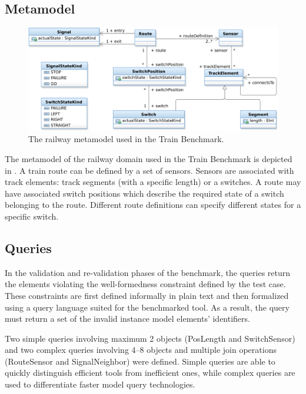 \subsection{Metamodel}
\label{sec:domain}

\begin{figure}[htb]
\begin{center}
\includegraphics[width=1\columnwidth]{figures/TrainMM.pdf}
\caption{The railway metamodel used in the Train Benchmark.}
\label{fig:metamodel}
\end{center}
\end{figure}


The metamodel of the railway domain used in the Train Benchmark is depicted in . A train \textsf{route} can be defined by a set of \textsf{sensors}. Sensors are associated with \textsf{track elements}: track \textsf{segment}s (with a specific length) or a \textsf{switch}es. A route may have associated \textsf{switch positions} which describe the required state of a switch belonging to the route. Different route definitions can specify different states for a specific switch.
 
\subsection{Queries}
\label{sec:queries}

In the validation and re-validation phases of the benchmark, the queries return the elements violating the well-formedness constraint defined by the test case. These constraints are first defined informally in plain text and then formalized using a query language suited for the benchmarked tool. As a result, the query must return a set of the invalid instance model elements' identifiers.
 
Two simple queries involving maximum 2 objects (\textsf{PosLength} and \textsf{SwitchSensor}) and two complex queries involving 4--8 objects and multiple join operations (\textsf{RouteSensor} and \textsf{SignalNeighbor}) were defined. Simple queries are able to quickly distinguish efficient tools from inefficient ones, while complex queries are used to differentiate faster model query technologies.
 
